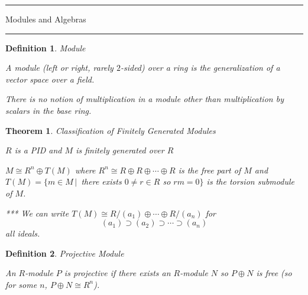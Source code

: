\documentclass[12pt]{Qual}
\newtheorem{theorem}{Theorem}
\newtheorem{definition}{Definition}
\begin{document}
\begin{center}
\noindent\textcolor{blue!60!black}{\rule{15cm}{1mm}}
\Huge \faBug\faPuzzlePiece\faCoffee Modules and Algebras \faCoffee\faPuzzlePiece\faBug
\vspace{-0.5cm}
\noindent\textcolor{blue!60!black}{\rule{15cm}{1mm}}
\end{center}
\vspace{0.25cm}
\begin{definition}{\Large\textit{Module}}
$\,$

A module (left or right, rarely $2$-sided) over a ring is the generalization of a vector space over a field.

There is no notion of multiplication in a module other than multiplication by scalars in the base ring.

\end{definition}
\vspace{0.5cm}
\begin{theorem}{\Large\textit{Classification of Finitely Generated Modules}}

 $R$ is a PID and $M$ is finitely generated over $R$

 \begin{minipage}{0.85\textwidth}
\vspace{0.8cm}
$M\cong R^n\oplus T(M)$ where $R^n\cong R\oplus R\oplus\cdots\oplus R$ is the free part of $M$ and $T(M)=\{m\in M\,|\, $ there exists $0\not=r\in R$ so $ rm=0\}$ is the torsion submodule of $M$.
\end{minipage}

\begin{mybox}
*** We can write $T(M)\cong R/(a_1)\oplus\cdots\oplus R/(a_n)$ for $$(a_1)\supset (a_2)\supset \cdots \supset (a_n)$$ all ideals.
\end{mybox}

\end{theorem}
\vspace{0.5cm}
\begin{definition}{\Large\textit{Projective Module}}
$\,$

An $R$-module $P$ is projective if there exists an $R$-module $N$ so $P\oplus N$ is free (so for some $n$, $P\oplus N\cong R^n$).

\end{definition}
\vspace{0.5cm}
\end{document}
